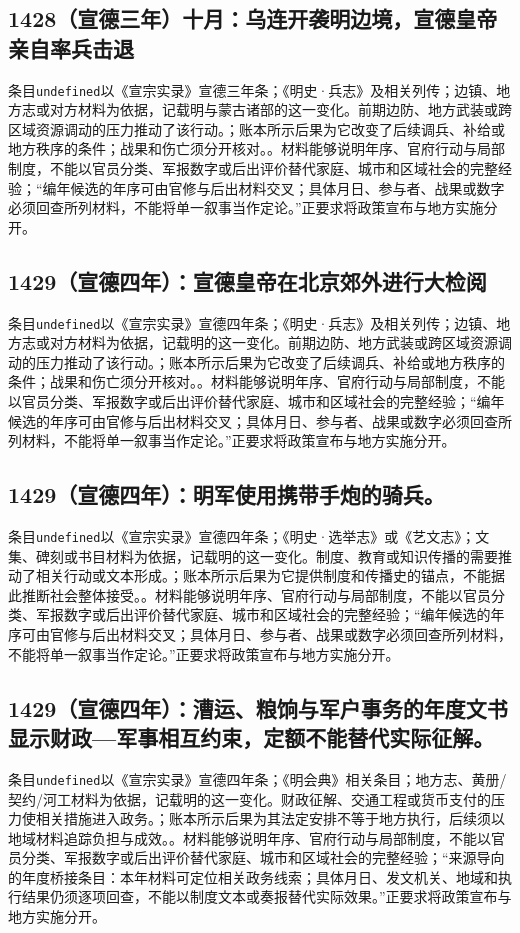 \subsection{1428（宣德三年）十月：乌连开袭明边境，宣德皇帝亲自率兵击退}
条目\texttt{undefined}以《宣宗实录》宣德三年条；《明史·兵志》及相关列传；边镇、地方志或对方材料为依据，记载明与蒙古诸部的这一变化。前期边防、地方武装或跨区域资源调动的压力推动了该行动。；账本所示后果为它改变了后续调兵、补给或地方秩序的条件；战果和伤亡须分开核对。。材料能够说明年序、官府行动与局部制度，不能以官员分类、军报数字或后出评价替代家庭、城市和区域社会的完整经验；“编年候选的年序可由官修与后出材料交叉；具体月日、参与者、战果或数字必须回查所列材料，不能将单一叙事当作定论。”正要求将政策宣布与地方实施分开。

\subsection{1429（宣德四年）：宣德皇帝在北京郊外进行大检阅}
条目\texttt{undefined}以《宣宗实录》宣德四年条；《明史·兵志》及相关列传；边镇、地方志或对方材料为依据，记载明的这一变化。前期边防、地方武装或跨区域资源调动的压力推动了该行动。；账本所示后果为它改变了后续调兵、补给或地方秩序的条件；战果和伤亡须分开核对。。材料能够说明年序、官府行动与局部制度，不能以官员分类、军报数字或后出评价替代家庭、城市和区域社会的完整经验；“编年候选的年序可由官修与后出材料交叉；具体月日、参与者、战果或数字必须回查所列材料，不能将单一叙事当作定论。”正要求将政策宣布与地方实施分开。

\subsection{1429（宣德四年）：明军使用携带手炮的骑兵。}
条目\texttt{undefined}以《宣宗实录》宣德四年条；《明史·选举志》或《艺文志》；文集、碑刻或书目材料为依据，记载明的这一变化。制度、教育或知识传播的需要推动了相关行动或文本形成。；账本所示后果为它提供制度和传播史的锚点，不能据此推断社会整体接受。。材料能够说明年序、官府行动与局部制度，不能以官员分类、军报数字或后出评价替代家庭、城市和区域社会的完整经验；“编年候选的年序可由官修与后出材料交叉；具体月日、参与者、战果或数字必须回查所列材料，不能将单一叙事当作定论。”正要求将政策宣布与地方实施分开。

\subsection{1429（宣德四年）：漕运、粮饷与军户事务的年度文书显示财政—军事相互约束，定额不能替代实际征解。}
条目\texttt{undefined}以《宣宗实录》宣德四年条；《明会典》相关条目；地方志、黄册/契约/河工材料为依据，记载明的这一变化。财政征解、交通工程或货币支付的压力使相关措施进入政务。；账本所示后果为其法定安排不等于地方执行，后续须以地域材料追踪负担与成效。。材料能够说明年序、官府行动与局部制度，不能以官员分类、军报数字或后出评价替代家庭、城市和区域社会的完整经验；“来源导向的年度桥接条目：本年材料可定位相关政务线索；具体月日、发文机关、地域和执行结果仍须逐项回查，不能以制度文本或奏报替代实际效果。”正要求将政策宣布与地方实施分开。

